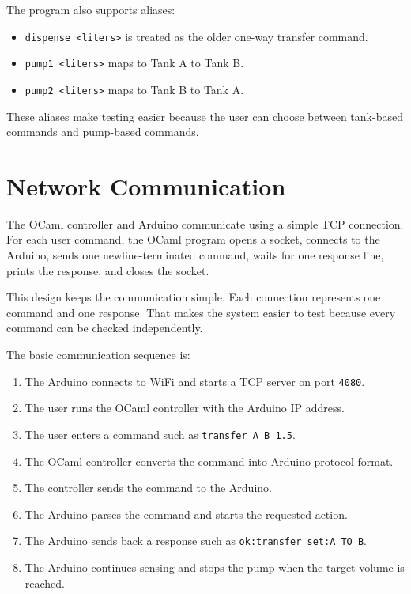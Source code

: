 The program also supports aliases:

\begin{itemize}
    \item \texttt{dispense <liters>} is treated as the older one-way transfer command.
    \item \texttt{pump1 <liters>} maps to Tank A to Tank B.
    \item \texttt{pump2 <liters>} maps to Tank B to Tank A.
\end{itemize}

These aliases make testing easier because the user can choose between tank-based commands and pump-based commands.

\section{Network Communication}

The OCaml controller and Arduino communicate using a simple TCP connection. For each user command, the OCaml program opens a socket, connects to the Arduino, sends one newline-terminated command, waits for one response line, prints the response, and closes the socket.

This design keeps the communication simple. Each connection represents one command and one response. That makes the system easier to test because every command can be checked independently.

The basic communication sequence is:

\begin{enumerate}
    \item The Arduino connects to WiFi and starts a TCP server on port \texttt{4080}.
    \item The user runs the OCaml controller with the Arduino IP address.
    \item The user enters a command such as \texttt{transfer A B 1.5}.
    \item The OCaml controller converts the command into Arduino protocol format.
    \item The controller sends the command to the Arduino.
    \item The Arduino parses the command and starts the requested action.
    \item The Arduino sends back a response such as \texttt{ok:transfer\_set:A\_TO\_B}.
    \item The Arduino continues sensing and stops the pump when the target volume is reached.
\end{enumerate}

